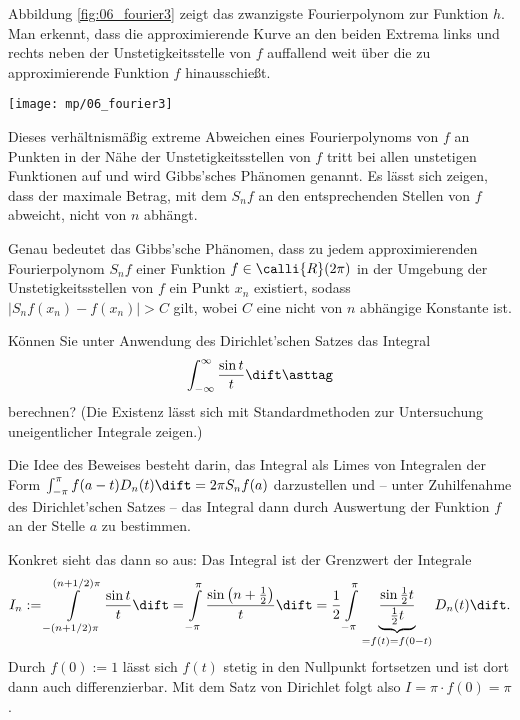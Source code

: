   \begin{antwort}
    Abbildung \ref{fig:06_fourier3} zeigt das zwanzigste Fourierpolynom zur 
    Funktion $h$. Man erkennt, dass die approximierende Kurve 
    an den beiden Extrema links und rechts neben der Unstetigkeitsstelle 
    von $f$ auffallend weit über die zu approximierende 
    Funktion $f$ hinausschießt. 

    \begin{center}
      \texttt{[image: mp/06\_fourier3]}
      \label{fig:06_fourier3}
    \end{center}

    Dieses verhältnismäßig extreme Abweichen eines Fourierpolynoms  
    von $f$ an Punkten in der Nähe der Unstetigkeitsstellen von $f$ 
    tritt bei allen unstetigen Funktionen auf und wird Gibbs'sches 
    Phänomen genannt. Es lässt sich zeigen, 
    dass der maximale Betrag, mit dem $S_nf$ an den 
    entsprechenden Stellen von $f$ abweicht, nicht von $n$ abhängt.   

    Genau bedeutet das Gibbs'sche Phänomen, dass zu jedem approximierenden 
    Fourierpolynom $S_nf$ einer Funktion $f\in\calli{R}(2\pi)$ 
    in der Umgebung der Unstetigkeitsstellen 
    von $f$ ein Punkt $x_n$ existiert, sodass $|S_n f(x_n)-f(x_n)|>C$ gilt,  
    wobei $C$ eine nicht von $n$ abhängige Konstante ist.   \AntEnd
  \end{antwort}

  \begin{frage}
    Können Sie unter Anwendung des Dirichlet'schen Satzes das Integral 
    \begin{equation}\label{diri_integral}
      \int_{-\infty}^\infty \frac{\sin t}{t} \dift
      \asttag
    \end{equation}
    berechnen? (Die Existenz lässt sich mit Standardmethoden zur Untersuchung 
    uneigentlicher Integrale zeigen.)
  \end{frage}

  \begin{antwort}
    Die Idee des Beweises besteht darin, das Integral als Limes 
    von Integralen der Form $\int_{-\pi}^\pi f(a-t)D_n(t)\dift=2\pi S_n f(a)$
    darzustellen und -- unter Zuhilfenahme des Dirichlet'schen Satzes -- das 
    Integral dann durch Auswertung der Funktion $f$ an der Stelle 
    $a$ zu bestimmen. 

    Konkret sieht das dann so aus: Das Integral {\astref} ist der 
    Grenzwert der Integrale
    \[
    I_n := \int\limits_{-(n+1/2)\pi}^{(n+1/2)\pi} \frac{\sin t}{t} \dift 
    =\int\limits_{-\pi}^\pi \frac{\sin\left( n+\frac{1}{2}\right)}{t} \dift
    =\frac{1}{2}\int\limits_{-\pi}^\pi
    \underbrace{\frac{\sin\frac{1}{2} t}{\frac{1}{2} t }}_{=f(t)=f(0-t)}
    D_n (t)\dift.
    \]
    Durch $f(0):=1$ lässt sich $f(t)$ stetig in den Nullpunkt fortsetzen 
    und ist dort dann auch differenzierbar. Mit dem Satz von Dirichlet folgt 
    also $I=\pi\cdot f(0)=\pi$.
    \AntEnd
  \end{antwort}

